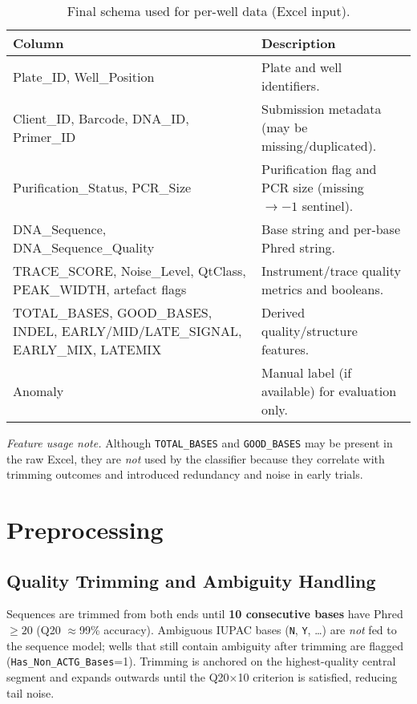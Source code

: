 \begin{table}[H]
  \centering
  \caption{Final schema used for per-well data (Excel input).}
  \label{tab:final_table_schema_impl}
  \begin{tabular}{|l|p{11cm}|}
    \hline
    \textbf{Column} & \textbf{Description} \\ \hline
    Plate\_ID, Well\_Position & Plate and well identifiers. \\ \hline
    Client\_ID, Barcode, DNA\_ID, Primer\_ID & Submission metadata (may be missing/duplicated). \\ \hline
    Purification\_Status, PCR\_Size & Purification flag and PCR size (missing $\rightarrow -1$ sentinel). \\ \hline
    DNA\_Sequence, DNA\_Sequence\_Quality & Base string and per-base Phred string. \\ \hline
    TRACE\_SCORE, Noise\_Level, QtClass, PEAK\_WIDTH, artefact flags & Instrument/trace quality metrics and booleans. \\ \hline
    TOTAL\_BASES, GOOD\_BASES, INDEL, EARLY/MID/LATE\_SIGNAL, EARLY\_MIX, LATEMIX & Derived quality/structure features. \\ \hline
    Anomaly & Manual label (if available) for evaluation only. \\ \hline
  \end{tabular}
\end{table}

\noindent\textit{Feature usage note.} Although \texttt{TOTAL\_BASES} and \texttt{GOOD\_BASES} may be present in the raw Excel, they are \emph{not} used by the classifier because they correlate with trimming outcomes and introduced redundancy and noise in early trials.

\section{Preprocessing}
\label{sec:preproc}

\subsection{Quality Trimming and Ambiguity Handling}
Sequences are trimmed from both ends until \textbf{10 consecutive bases} have Phred $\geq 20$ (Q20 $\approx$99\% accuracy). Ambiguous IUPAC bases (\texttt{N}, \texttt{Y}, \ldots) are \emph{not} fed to the sequence model; wells that still contain ambiguity after trimming are flagged (\texttt{Has\_Non\_ACTG\_Bases}=1). Trimming is anchored on the highest-quality central segment and expands outwards until the Q20$\times$10 criterion is satisfied, reducing tail noise.

